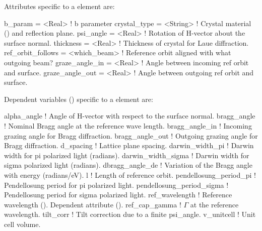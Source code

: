 Attributes specific to a  element are:
\begin{example}
  b_param            = <Real>       ! b parameter
  crystal_type       = <String>     ! Crystal material () and reflection plane.
  psi_angle          = <Real>       ! Rotation of H-vector about the surface normal.
  thickness          = <Real>       ! Thickness of crystal for Laue diffraction.
  ref_orbit_follows  = <which_beam> ! Reference orbit aligned with what outgoing beam?
  graze_angle_in     = <Real>       ! Angle between incoming ref orbit and surface.
  graze_angle_out    = <Real>       ! Angle between outgoing ref orbit and surface.
\end{example}

Dependent variables () specific to a  element are:
\begin{example}
  alpha_angle                ! Angle of H-vector with respect to the surface normal.
  bragg_angle                ! Nominal Bragg angle at the reference wave length. 
  bragg_angle_in             ! Incoming grazing angle for Bragg diffraction.
  bragg_angle_out            ! Outgoing grazing angle for Bragg diffraction.
  d_spacing                  ! Lattice plane spacing. 
  darwin_width_pi            ! Darwin width for pi polarized light (radians).
  darwin_width_sigma         ! Darwin width for sigma polarized light (radians).
  dbragg_angle_de            ! Variation of the Bragg angle with energy (radians/eV).
  l                          ! Length of reference orbit.
  pendellosung_period_pi     ! Pendellosung period for pi polarized light.
  pendellosung_period_sigma  ! Pendellosung period for sigma polarized light.
  ref_wavelength             ! Reference wavelength (). Dependent attribute ().
  ref_cap_gamma              ! \(\Gamma\) at the reference wavelength.
  tilt_corr                  ! Tilt correction due to a finite psi_angle.
  v_unitcell                 ! Unit cell volume. 
\end{example}

